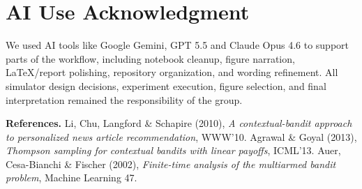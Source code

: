 \documentclass[11pt,a4paper]{article}
\begin{document}
\newpage
\section*{AI Use Acknowledgment}
\small

We used AI tools like Google Gemini, GPT 5.5 and Claude Opus 4.6 to support parts of the workflow, including notebook cleanup, figure narration, LaTeX/report polishing, repository organization, and wording refinement. All simulator design decisions, experiment execution, figure selection, and final interpretation remained the responsibility of the group.

\vspace{0.6em}
\footnotesize\noindent\textbf{References.}
Li, Chu, Langford \& Schapire (2010), \emph{A contextual-bandit approach to
personalized news article recommendation}, WWW'10. \;
Agrawal \& Goyal (2013), \emph{Thompson sampling for contextual bandits with
linear payoffs}, ICML'13. \;
Auer, Cesa-Bianchi \& Fischer (2002), \emph{Finite-time analysis of the
multiarmed bandit problem}, Machine Learning 47.
\end{document}
